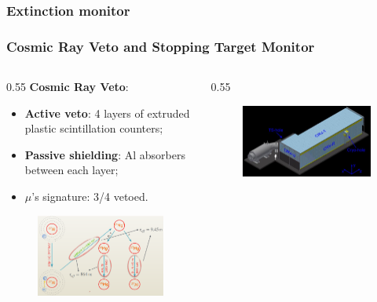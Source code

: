 \documentclass{beamer}
\begin{document}
\begin{frame}
    \frametitle{Extinction monitor}
\end{frame}


\begin{frame}
    \frametitle{Cosmic Ray Veto and Stopping Target Monitor}
    \vspace{-2mm}
 \begin{columns}
            \begin{column}{0.55\framewidth}
                     \textbf{Cosmic Ray Veto}:
         \begin{itemize}
         \item \textbf{Active veto}: 4 layers of extruded plastic scintillation counters;
                \item \textbf{Passive shielding}: Al absorbers between each layer;
               \item $\mu$'s signature: 3/4 vetoed.
            \end{itemize}
             \begin{figure}[h]
            \centering
            \includegraphics[width=0.9\columnwidth ]{figures/png/Screenshot_20240706_094517.png}
        \end{figure}
            \end{column}
            \begin{column}{0.55\framewidth}
            \begin{figure}[h]
            \centering
            \includegraphics[width=0.8\columnwidth ]{figures/jpg/Crv_downstream.jpg}

\end{figure}
\end{column}
\end{columns}
\end{frame}
\end{document}

